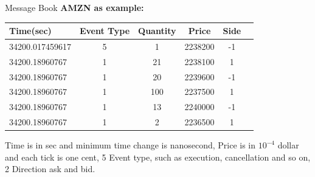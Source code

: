 \documentclass[xcolor={x11names,svgnames,dvipsnames}]{beamer}
\begin{document}
\begin{frame}
\begin{block}{Message Book}
\textbf{AMZN as example:}
\begin{table}

	\begin{center} 
		\begin{tabular}{|l|c|c|c|c|c|}
			\hline
			Time(sec) & Event Type & Quantity & Price & Side\\[5pt]
			 \hline
		34200.017459617& 5 &  1& 2238200& -1\\
		34200.18960767& 1& 21& 2238100& 1 \\
		34200.18960767&	1&	20& 2239600 & -1\\
		34200.18960767& 1& 100& 2237500& 1 \\
		34200.18960767& 1& 13& 2240000& -1 \\
		34200.18960767& 1& 2& 2236500 & 1 \\
			\hline 
		\end{tabular}
	\end{center}
\end{table}
\end{block}

Time is in sec and minimum time change is \alert{nanosecond}, Price is in $10^{-4}$ dollar and each tick is one cent, 5 Event type, such as execution, cancellation and so on, 2 Direction ask and bid. 

\end{frame}
\end{document}
